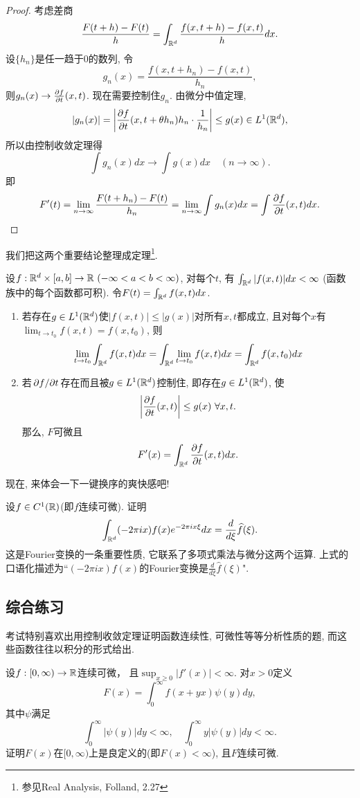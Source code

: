 \begin{proof}
    考虑差商
    $$\frac{F(t+h)-F(t)}{h} = \int_{\mathbb{R}^d} \frac{f(x,t+h)-f(x,t)}{h}
      dx. $$
    设$\{h_n\}$是任一趋于$0$的数列, 令
    $$g_n(x)=\frac{f(x, t+h_n)-f(x,t)}{h_n},$$
    则$g_n(x) \to {\pdv{f}{t}}(x,t)$. 现在需要控制住$g_n$. 由微分中值定理, 
    $$|g_n(x)|=\left|{\pdv{f}{t}}(x, t+\theta h_n)h_n \cdot \frac{1}{h_n}\right| \leq g(x) \in L^1(\mathbb{R}^d),$$
    所以由控制收敛定理得
    $$\int g_n(x)dx \to \int g(x)dx \quad (n \to \infty).$$
    即
    $$F'(t)=\lim_{n \to \infty}\frac{F(t+h_n)-F(t)}{h_n}=
    \lim_{n \to \infty}\int g_n(x)dx = \int {\pdv{f}{t}}(x,t)dx. $$
\end{proof}
我们把这两个重要结论整理成定理\footnote{参见Real Analysis, Folland, 2.27}.
\begin{theorem}[一键换序]
    设$f:\mathbb{R}^d \times [a,b] \to \mathbb{R} ~(-\infty<a<b<\infty)$, 对每个$t$, 有
    $\int_{\mathbb{R}^d} |f(x,t)|dx < \infty~$(函数族中的每个函数都可积). 令$F(t)=\int_{\mathbb{R}^d} f(x,t)dx$.
    \begin{enumerate}
    \item 若存在$g \in L^1(\mathbb{R}^d)$使$|f(x,t)| \leq |g(x)|$对所有$x,t$都成立, 且对每个$x$有$\lim_{t\to t_0}f(x,t)=f(x,t_0)$, 则
    $$\lim_{t\to t_0} \int_{\mathbb{R}^d} f(x,t)dx = \int_{\mathbb{R}^d} \lim_{t\to t_0} f(x,t)dx = \int_{\mathbb{R}^d} f(x,t_0)dx$$
    \item 若$\pdv*{f}{t}$存在而且被$g \in L^1(\mathbb{R}^d)$控制住, 即存在$g \in L^1(\mathbb{R}^d)$, 使
    $$\left|{\pdv{f}{t}}(x,t) \right| \leq g(x) ~\forall x,t.$$
    那么, $F$可微且
    $$F'(x)=\int_{\mathbb{R}^d} {\pdv{f}{t}}(x,t) dx.$$
    \end{enumerate}
\end{theorem}
现在, 来体会一下一键换序的爽快感吧!
\begin{exercise}
    设$f \in C^1(\mathbb{R})$(即$f$连续可微). 证明
    $$\int_{\mathbb{R}^d} (-2\pi ix)f(x)e^{-2\pi i x\xi} dx 
      = \frac{d}{d\xi}\widehat{f}(\xi). $$
    这是Fourier变换的一条重要性质, 它联系了多项式乘法与微分这两个运算. 
    上式的口语化描述为``$(-2\pi ix)f(x)$的Fourier变换是$\frac{d}{d\xi}\hat{f}(\xi)$".
\end{exercise}

\subsection{综合练习}
考试特别喜欢出用控制收敛定理证明函数连续性, 可微性等等分析性质的题, 而这些函数往往以积分的形式给出. 

\begin{exercise} %
    设$f:[0,\infty) \to \mathbb{R}$连续可微， 且$\sup_{x \geq 0}|f'(x)|<\infty$. 对$x>0$定义
    $$F(x) = \int_0^\infty f(x+yx)\psi(y)dy,$$
    其中$\psi$满足
    $$\int_0^\infty |\psi(y)|dy < \infty, \quad \int_0^\infty y|\psi(y)|dy < \infty.$$    
    证明$F(x)$在$[0,\infty)$上是良定义的(即$F(x)<\infty$), 且$F$连续可微.
\end{exercise}

